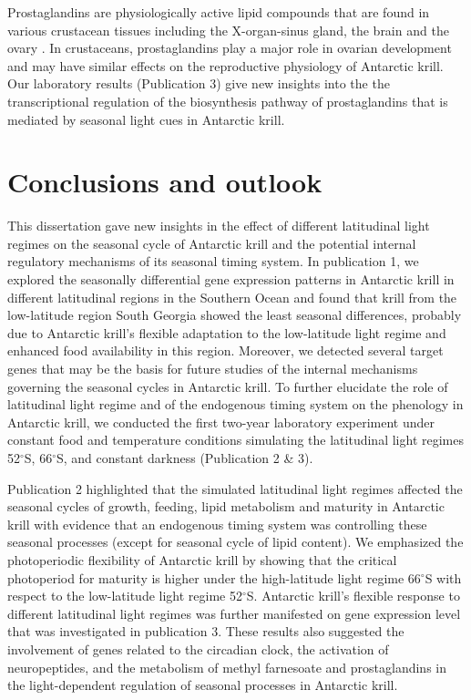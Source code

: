 Prostaglandins are physiologically active lipid compounds that are found in
various crustacean tissues including the X-organ-sinus gland, the brain and the
ovary \citep{nagaraju_reproductive_2011}. In crustaceans, prostaglandins play a
major role in ovarian development \citep{wimuttisuk_insights_2013} and may have
similar effects on the reproductive physiology of Antarctic krill. Our
laboratory results (Publication 3) give new insights into the the
transcriptional regulation of the biosynthesis pathway of prostaglandins that
is mediated by seasonal light cues in Antarctic krill.

\section{Conclusions and outlook}

This dissertation gave new insights in the effect of different latitudinal
light regimes on the seasonal cycle of Antarctic krill and the potential
internal regulatory mechanisms of its seasonal timing system. In publication 1,
we explored the seasonally differential gene expression patterns in Antarctic
krill in different latitudinal regions in the Southern Ocean and found that
krill from the low-latitude region South Georgia showed the least seasonal
differences, probably due to Antarctic krill's flexible adaptation to the
low-latitude light regime and enhanced food availability in this region.
Moreover, we detected several target genes that may be the basis for future
studies of the internal mechanisms governing the seasonal cycles in Antarctic
krill. To further elucidate the role of latitudinal light regime and of the
endogenous timing system on the phenology in Antarctic krill, we conducted the
first two-year laboratory experiment under constant food and temperature
conditions simulating the latitudinal light regimes 52$^{\circ}$S,
66$^{\circ}$S, and constant darkness (Publication 2 \& 3).

Publication 2 highlighted that the simulated latitudinal light regimes affected
the seasonal cycles of growth, feeding, lipid metabolism and maturity in
Antarctic krill with evidence that an endogenous timing system was controlling
these seasonal processes (except for seasonal cycle of lipid content). We
emphasized the photoperiodic flexibility of Antarctic krill by showing that the
critical photoperiod for maturity is higher under the high-latitude light
regime 66$^\circ$S with respect to the low-latitude light regime 52$^{\circ}$S.
Antarctic krill's flexible response to different latitudinal light regimes was
further manifested on gene expression level that was investigated in
publication 3.  These results also suggested the involvement of genes related
to the circadian clock, the activation of neuropeptides, and the metabolism of
methyl farnesoate and prostaglandins in the light-dependent regulation of
seasonal processes in Antarctic krill.


